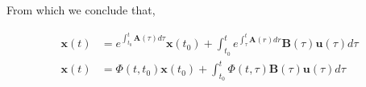\documentclass[12pt]{article}
\begin{document}
	From which we conclude that,
	
	\begin{align}
	\mathbf{x}(t) &= e^{\int_{t_{0}}^{t}\mathbf{A}(\tau)d\tau}\mathbf{x}(t_{0}) + \int_{t_{0}}^{t}e^{\int_{\tau}^{t}\mathbf{A}(r)dr}\mathbf{B}(\tau)\mathbf{u}(\tau)d\tau\\
	\mathbf{x}(t) &= \Phi(t,t_{0})\mathbf{x}(t_{0}) + \int_{t_{0}}^{t}\Phi(t,\tau)\mathbf{B}(\tau)\mathbf{u}(\tau)d\tau
	\end{align}
\end{document}
